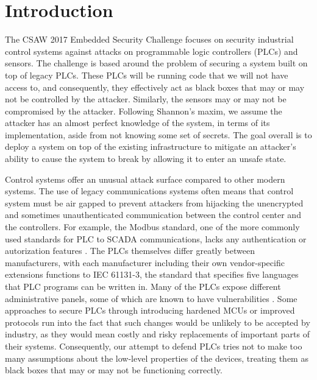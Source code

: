\documentclass[10pt,twocolumn]{IEEEtran}
\begin{document}
\section{Introduction}
The CSAW 2017 Embedded Security Challenge focuses on security industrial control systems against attacks on programmable logic controllers (PLCs) and sensors.
The challenge is based around the problem of securing a system built on top of legacy PLCs.
These PLCs will be running code that we will not have access to, and consequently, they effectively act as black boxes that may or may not be controlled by the attacker.
Similarly, the sensors may or may not be compromised by the attacker.
Following Shannon's maxim, we assume the attacker has an almost perfect knowledge of the system, in terms of its implementation, aside from not knowing some set of secrets.
The goal overall is to deploy a system on top of the existing infrastructure to mitigate an attacker's ability to cause the system to break by allowing it to enter an unsafe state.

Control systems offer an unusual attack surface compared to other modern systems.
The use of legacy communications systems often means that control system must be air gapped to prevent attackers from hijacking the unencrypted and sometimes unauthenticated communication between the control center and the controllers.
For example, the Modbus standard, one of the more commonly used standards for PLC to SCADA communications, lacks any authentication or autorization features \cite{modbus}.
The PLCs themselves differ greatly between manufacturers, with each manufacturer including their own vendor-specific extensions functions to IEC 61131-3, the standard that specifies five languages that PLC programs can be written in.
Many of the PLCs expose different administrative panels, some of which are known to have vulnerabilities \cite{metasploit}.
Some approaches to secure PLCs through introducing hardened MCUs or improved protocols run into the fact that such changes would be unlikely to be accepted by industry, as they would mean costly and risky replacements of important parts of their systems.
Consequently, our attempt to defend PLCs tries not to make too many assumptions about the low-level properties of the devices, treating them as black boxes that may or may not be functioning correctly.
\end{document}
